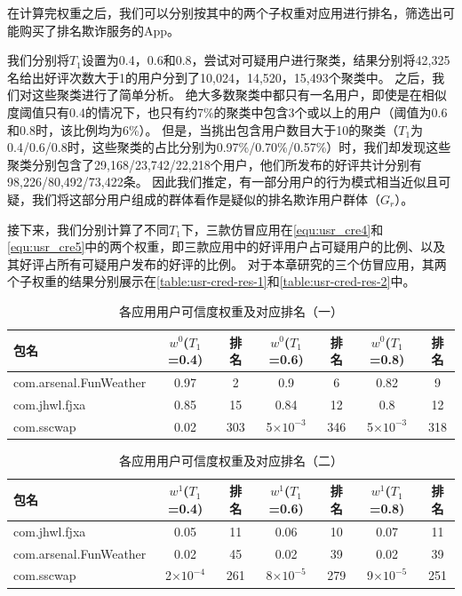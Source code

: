 在计算完权重之后，我们可以分别按其中的两个子权重对应用进行排名，筛选出可能购买了排名欺诈服务的App。

我们分别将$T_1$设置为0.4，0.6和0.8，尝试对可疑用户进行聚类，结果分别将42,325名给出好评次数大于1的用户分到了10,024，14,520，15,493个聚类中。
之后，我们对这些聚类进行了简单分析。
绝大多数聚类中都只有一名用户，即使是在相似度阈值只有0.4的情况下，也只有约7\%的聚类中包含3个或以上的用户（阈值为0.6和0.8时，该比例均为6\%）。
但是，当挑出包含用户数目大于10的聚类（$T_1$为0.4/0.6/0.8时，这些聚类的占比分别为0.97\%/0.70\%/0.57\%）时，我们却发现这些聚类分别包含了29,168/23,742/22,218个用户，他们所发布的好评共计分别有98,226/80,492/73,422条。
因此我们推定，有一部分用户的行为模式相当近似且可疑，我们将这部分用户组成的群体看作是疑似的排名欺诈用户群体（$G_r$）。

接下来，我们分别计算了不同$T_1$下，三款仿冒应用在\autoref{equ:usr_cre4}和\autoref{equ:usr_cre5}中的两个权重，即三款应用中的好评用户占可疑用户的比例、以及其好评占所有可疑用户发布的好评的比例。
对于本章研究的三个仿冒应用，其两个子权重的结果分别展示在\autoref{table:usr-cred-res-1}和\autoref{table:usr-cred-res-2}中。

\begin{table}[htbp]
	\renewcommand{\arraystretch}{1}
	\small
	\centering
	\caption{各应用用户可信度权重及对应排名（一）}
	\vspace{1mm}
	\begin{tabular}{lcccccc}
		\toprule
		包名 & $w^0$($T_1$=0.4) & 排名 & $w^0$($T_1$=0.6) & 排名 & $w^0$($T_1$=0.8) & 排名 \\
		\midrule
		com.arsenal.FunWeather & 0.97 & 2 & 0.9 & 6 & 0.82 & 9 \\
		\rowcolor{gray!15} com.jhwl.fjxa & 0.85 & 15 & 0.84 & 12 & 0.8 & 12 \\
		com.sscwap & 0.02 & 303 & 5$\times10^{-3}$ & 346 & 5$\times10^{-3}$ & 318 \\
		\bottomrule
	\end{tabular}
	\label{table:usr-cred-res-1}
\end{table}

\begin{table}[htbp]
	\renewcommand{\arraystretch}{1}
	\small
	\centering
	\caption{各应用用户可信度权重及对应排名（二）}
	\vspace{1mm}
	\begin{tabular}{lcccccc}
		\toprule
		包名 & $w^1$($T_1$=0.4) & 排名 & $w^1$($T_1$=0.6) & 排名 & $w^1$($T_1$=0.8) & 排名 \\
		\midrule
		com.jhwl.fjxa & 0.05 & 11 & 0.06 & 10 & 0.07 & 11 \\
		\rowcolor{gray!15} com.arsenal.FunWeather & 0.02 & 45 & 0.02 & 39 & 0.02 & 39 \\
		com.sscwap & 2$\times10^{-4}$ & 261 & 8$\times10^{-5}$ & 279 & 9$\times10^{-5}$ & 251 \\
		\bottomrule
	\end{tabular}
	\label{table:usr-cred-res-2}
\end{table}

